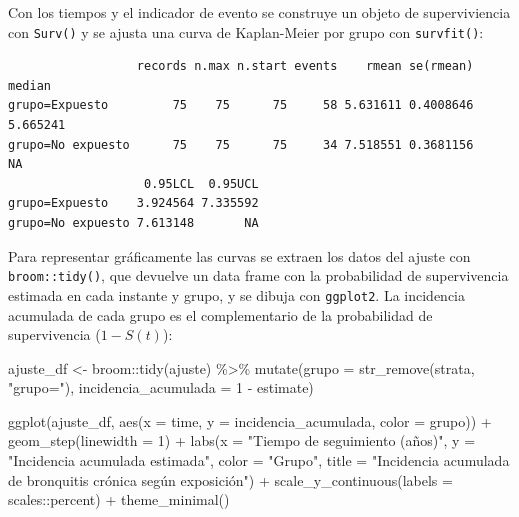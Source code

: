 \documentclass[
  spanish,
  a4paper,
]{scrreport}
\newenvironment{Shaded}{\begin{snugshade}}{\end{snugshade}}
\newcommand{\AttributeTok}[1]{\textcolor[rgb]{0.40,0.45,0.13}{#1}}
\newcommand{\DecValTok}[1]{\textcolor[rgb]{0.68,0.00,0.00}{#1}}
\newcommand{\FunctionTok}[1]{\textcolor[rgb]{0.28,0.35,0.67}{#1}}
\newcommand{\NormalTok}[1]{\textcolor[rgb]{0.00,0.23,0.31}{#1}}
\newcommand{\OtherTok}[1]{\textcolor[rgb]{0.00,0.23,0.31}{#1}}
\newcommand{\SpecialCharTok}[1]{\textcolor[rgb]{0.37,0.37,0.37}{#1}}
\newcommand{\StringTok}[1]{\textcolor[rgb]{0.13,0.47,0.30}{#1}}
\theoremstyle{definition}
\theoremstyle{definition}
\theoremstyle{remark}
\begin{document}
Con los tiempos y el indicador de evento se construye un objeto de
superviviencia con \texttt{Surv()} y se ajusta una curva de Kaplan-Meier
por grupo con \texttt{survfit()}:

\begin{Shaded}
\end{Shaded}

\begin{verbatim}
                  records n.max n.start events    rmean se(rmean)   median
grupo=Expuesto         75    75      75     58 5.631611 0.4008646 5.665241
grupo=No expuesto      75    75      75     34 7.518551 0.3681156       NA
                   0.95LCL  0.95UCL
grupo=Expuesto    3.924564 7.335592
grupo=No expuesto 7.613148       NA
\end{verbatim}

Para representar gráficamente las curvas se extraen los datos del ajuste
con \texttt{broom::tidy()}, que devuelve un data frame con la
probabilidad de supervivencia estimada en cada instante y grupo, y se
dibuja con \texttt{ggplot2}. La incidencia acumulada de cada grupo es el
complementario de la probabilidad de supervivencia (\(1 - S(t)\)):

\begin{Shaded}
\begin{Highlighting}[]
\NormalTok{ajuste\_df }\OtherTok{\textless{}{-}}\NormalTok{ broom}\SpecialCharTok{::}\FunctionTok{tidy}\NormalTok{(ajuste) }\SpecialCharTok{\%\textgreater{}\%}
  \FunctionTok{mutate}\NormalTok{(}\AttributeTok{grupo =} \FunctionTok{str\_remove}\NormalTok{(strata, }\StringTok{"grupo="}\NormalTok{),}
         \AttributeTok{incidencia\_acumulada =} \DecValTok{1} \SpecialCharTok{{-}}\NormalTok{ estimate)}

\FunctionTok{ggplot}\NormalTok{(ajuste\_df, }\FunctionTok{aes}\NormalTok{(}\AttributeTok{x =}\NormalTok{ time, }\AttributeTok{y =}\NormalTok{ incidencia\_acumulada, }\AttributeTok{color =}\NormalTok{ grupo)) }\SpecialCharTok{+}
  \FunctionTok{geom\_step}\NormalTok{(}\AttributeTok{linewidth =} \DecValTok{1}\NormalTok{) }\SpecialCharTok{+}
  \FunctionTok{labs}\NormalTok{(}\AttributeTok{x =} \StringTok{"Tiempo de seguimiento (años)"}\NormalTok{,}
       \AttributeTok{y =} \StringTok{"Incidencia acumulada estimada"}\NormalTok{,}
       \AttributeTok{color =} \StringTok{"Grupo"}\NormalTok{,}
       \AttributeTok{title =} \StringTok{"Incidencia acumulada de bronquitis crónica según exposición"}\NormalTok{) }\SpecialCharTok{+}
  \FunctionTok{scale\_y\_continuous}\NormalTok{(}\AttributeTok{labels =}\NormalTok{ scales}\SpecialCharTok{::}\NormalTok{percent) }\SpecialCharTok{+}
  \FunctionTok{theme\_minimal}\NormalTok{()}
\end{Highlighting}
\end{Shaded}
\end{document}
